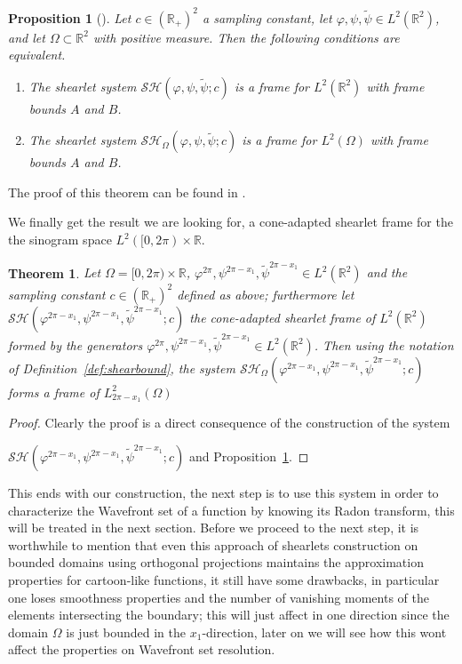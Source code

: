 \documentclass[a4paper]{article}
\newtheorem{theorem}{Theorem}
\newtheorem{proposition}{Proposition}
\begin{document}
\begin{proposition}[\cite{ShearBounded}]
\label{prop:shearboundframe}
Let $c\in(\mathbb{R}_+)^2$ a sampling constant, let $\varphi,\psi,\tilde{\psi}\in L^2(\mathbb{R}^2)$, and let $\Omega\subset \mathbb{R}^2$ with positive measure. Then the following conditions are equivalent.

\begin{enumerate}
\item[(i)] The shearlet system $\mathcal{SH}(\varphi,\psi,\tilde{\psi};c)$ is a frame for $L^2(\mathbb{R}^2)$ with frame bounds $A$ and $B$.

\item[(ii)]  The shearlet system $\mathcal{SH}_{\Omega}(\varphi,\psi,\tilde{\psi};c)$ is a frame for $L^2(\Omega)$ with frame bounds $A$ and $B$.
\end{enumerate}
\end{proposition}
The proof of this theorem can be found in \cite{ShearBounded}.

\bigskip

We finally get the result we are looking for, a cone-adapted shearlet frame for the the sinogram space $L^2([0,2\pi)\times \mathbb{R}$.

\bigskip

\begin{theorem}
\label{thm:periodicboundedframe}
Let $\Omega = [0,2\pi)\times\mathbb{R}$, $\varphi^{2\pi}, \psi^{2\pi-x_1},\tilde{\psi}^{2\pi-x_1}\in L^2(\mathbb{R}^2)$ and the sampling constant $c\in (\mathbb{R}_+)^2$ defined as above; furthermore let $\mathcal{SH}(\varphi^{2\pi-x_1},\psi^{2\pi-x_1},\tilde{\psi}^{2\pi-x_1};c)$ the cone-adapted shearlet frame of $L^2(\mathbb{R}^2)$ formed by the generators $\varphi^{2\pi}, \psi^{2\pi-x_1},\tilde{\psi}^{2\pi-x_1}\in L^2(\mathbb{R}^2)$. Then using the notation of Definition~\ref{def:shearbound}, the system $\mathcal{SH}_{\Omega}(\varphi^{2\pi-x_1},\psi^{2\pi-x_1},\tilde{\psi}^{2\pi-x_1};c)$ forms a frame of $L^2_{2\pi-x_1}(\Omega)$
\end{theorem}

\begin{proof}
Clearly the proof is a direct consequence of the construction of the system

$\mathcal{SH}(\varphi^{2\pi-x_1},\psi^{2\pi-x_1},\tilde{\psi}^{2\pi-x_1};c)$ and Proposition~\ref{prop:shearboundframe}.
\end{proof}

\bigskip

This ends with our construction, the next step is to use this system in order to characterize the Wavefront set of a function by knowing its Radon transform, this will be treated in the next section. Before we proceed to the next step, it is worthwhile to mention that even this approach of shearlets construction on bounded domains using orthogonal projections maintains the approximation properties for cartoon-like functions, it still have some drawbacks, in particular one loses smoothness properties and the number of vanishing moments of the elements intersecting the boundary; this will just affect in one direction since the domain $\Omega$ is just bounded in the $x_1$-direction, later on we will see how this wont affect the properties on Wavefront set resolution. 
\end{document}

